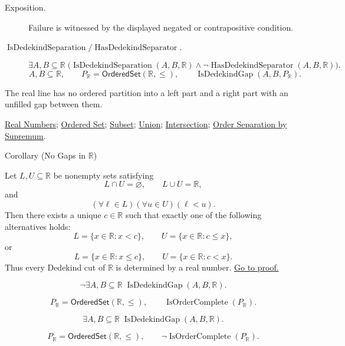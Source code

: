 \begin{remark*}
\begin{description}
  \item[Exposition.]
  Failure is witnessed by the displayed negated or contrapositive condition.

  \item[\(\operatorname{IsDedekindSeparation} / \operatorname{HasDedekindSeparator}.\)]
  \[
\exists A,B\subseteq\mathbb{R}\;
\bigl(\operatorname{IsDedekindSeparation}(A,B,\mathbb{R})\land
\neg\operatorname{HasDedekindSeparator}(A,B,\mathbb{R})\bigr).
\]
\[
A,B\subseteq\mathbb{R},\qquad P_{\mathbb{R}}=\mathsf{OrderedSet}(\mathbb{R},\leq),\qquad
\operatorname{IsDedekindGap}(A,B,P_{\mathbb{R}}).
\]
\end{description}
\end{remark*}
\begin{remark*}[Interpretation]
The real line has no ordered partition into a left part and a right part with
an unfilled gap between them.
\end{remark*}
\begin{dependencies}
\hyperref[def:reals]{Real Numbers};
\hyperref[def:ordered-set]{Ordered Set};
\hyperref[def:subset]{Subset};
\hyperref[def:union]{Union};
\hyperref[def:intersection]{Intersection};
\hyperref[thm:order-separation-by-supremum]{Order Separation by Supremum}.
\end{dependencies}

\begin{corollarybox}{Corollary (No Gaps in $\mathbb{R}$)}
\begin{corollary}
\label{cor:no-gaps-in-r}
Let $L,U\subseteq\mathbb{R}$ be nonempty sets satisfying
\[
  L\cap U=\varnothing,
  \qquad
  L\cup U=\mathbb{R},
\]
and
\[
  (\forall \ell\in L)(\forall u\in U)(\ell<u).
\]
Then there exists a unique $c\in\mathbb{R}$ such that exactly one of the
following alternatives holds:
\[
  L=\{x\in\mathbb{R}:x<c\},
  \qquad
  U=\{x\in\mathbb{R}:c\leq x\},
\]
or
\[
  L=\{x\in\mathbb{R}:x\leq c\},
  \qquad
  U=\{x\in\mathbb{R}:c<x\}.
\]
Thus every Dedekind cut of $\mathbb{R}$ is determined by a real number.
\hyperref[prf:no-gaps-in-r]{Go to proof.}
\end{corollary}
\end{corollarybox}
\begin{remark*}
\[
\neg\exists A,B\subseteq\mathbb{R}\;\operatorname{IsDedekindGap}(A,B,\mathbb{R}).
\]
\end{remark*}
\begin{remark*}
\[
P_{\mathbb{R}}=\mathsf{OrderedSet}(\mathbb{R},\leq),\qquad
\operatorname{IsOrderComplete}(P_{\mathbb{R}}).
\]
\end{remark*}
\begin{remark*}
\[
\exists A,B\subseteq\mathbb{R}\;\operatorname{IsDedekindGap}(A,B,\mathbb{R}).
\]
\end{remark*}
\begin{remark*}
\[
P_{\mathbb{R}}=\mathsf{OrderedSet}(\mathbb{R},\leq),\qquad
\neg\operatorname{IsOrderComplete}(P_{\mathbb{R}}).
\]
\end{remark*}

